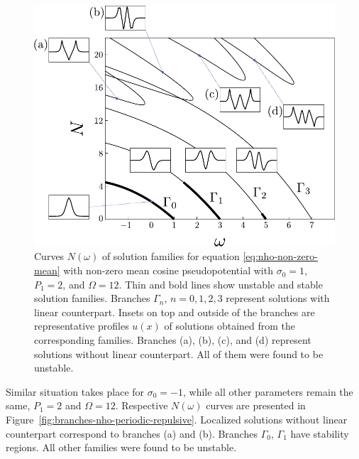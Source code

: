 \begin{figure}[h]
\centering
	\includegraphics[scale = 1]{pic/branches for cosine nho, case (a)}
	\caption{
		Curves $N(\omega)$ of solution families for equation \eqref{eq:nho-non-zero-mean} with non-zero mean cosine pseudopotential with $\sigma_0 = 1$, $P_1 = 2$, and $\Omega = 12$.
		Thin and bold lines show unstable and stable solution families.
		Branches $\Gamma_n$, $n = 0, 1, 2, 3$ represent solutions with linear counterpart.
		Insets on top and outside of the branches are representative profiles $u(x)$ of solutions obtained from the corresponding families.
		Branches (a), (b), (c), and (d) represent solutions without linear counterpart.
		All of them were found to be unstable.
	}
\label{fig:branches-nho-periodic-attractive}
\end{figure}

Similar situation takes place for $\sigma_0 = -1$, while all other parameters remain the same, $P_1 = 2$ and $\Omega = 12$.
Respective $N(\omega)$ curves are presented in Figure~\ref{fig:branches-nho-periodic-repulsive}.
Localized solutions without linear counterpart correspond to branches (a) and (b).
Branches $\Gamma_0$, $\Gamma_1$ have stability regions.
All other families were found to be unstable.

